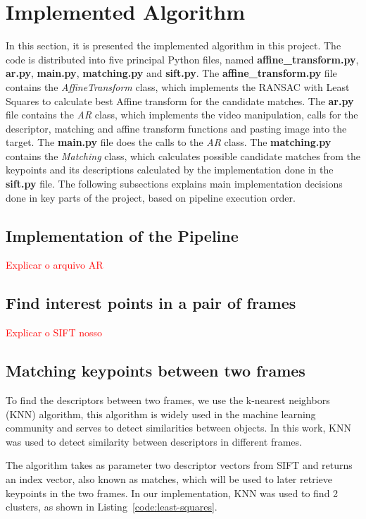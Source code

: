 \documentclass[]{IEEEtran}
\newcommand\todolist[1]{\textcolor{red}{#1}}
\begin{document}
\section{Implemented Algorithm}
In this section, it is presented the implemented algorithm in this project. The code is distributed into five principal Python files, named \textbf{affine\_transform.py}, \textbf{ar.py}, \textbf{main.py}, \textbf{matching.py} and \textbf{sift.py}. The \textbf{affine\_transform.py} file contains the \textit{AffineTransform} class, which implements the RANSAC with Least Squares to calculate best Affine transform for the candidate matches. The \textbf{ar.py} file contains the \textit{AR} class, which implements the video manipulation, calls for the descriptor, matching and affine transform functions and pasting image into the target. The \textbf{main.py} file does the calls to the \textit{AR} class. The \textbf{matching.py} contains the \textit{Matching} class, which calculates possible candidate matches from the keypoints and its descriptions calculated by the implementation done in the \textbf{sift.py} file. The following subsections explains main implementation decisions done in key parts of the project, based on pipeline execution order.


\subsection{Implementation of the Pipeline}
\todolist{Explicar o arquivo AR}


\subsection{Find interest points in a pair of frames}
\todolist{Explicar o SIFT nosso}


\subsection{Matching keypoints between two frames}

To find the descriptors between two frames, we use the k-nearest neighbors (KNN) algorithm, this algorithm is widely used in the machine learning community and serves to detect similarities between objects. In this work, KNN was used to detect similarity between descriptors in different frames.

The algorithm takes as parameter two descriptor vectors from SIFT and returns an index vector, also known as matches, which will be used to later retrieve keypoints in the two frames. In our implementation, KNN was used to find 2 clusters, as shown in Listing~\ref{code:least-squares}.
\end{document}

